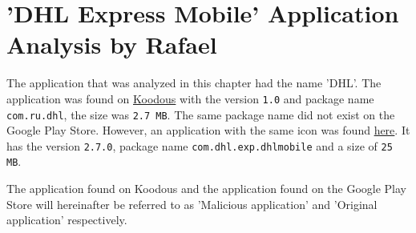 \section{'DHL Express Mobile' Application Analysis by Rafael}

The application that was analyzed in this chapter had the name 'DHL'.
The application was found on \href{https://koodous.com/apks/38ff459a46e9ea6d63a83c1eddb640626fef562cd1bcb0ab3823c4770d07d0fb}{Koodous} with the version \texttt{1.0} and package name \texttt{com.ru.dhl}, the size was \texttt{2.7 MB}.
The same package name did not exist on the Google Play Store. However, an application with the same icon was found \href{https://play.google.com/store/apps/details?id=com.dhl.exp.dhlmobile}{here}. It has the version \texttt{2.7.0}, package name \texttt{com.dhl.exp.dhlmobile} and a size of \texttt{25 MB}.

The application found on Koodous and the application found on the Google Play Store will hereinafter be referred to as 'Malicious application' and 'Original application' respectively.








